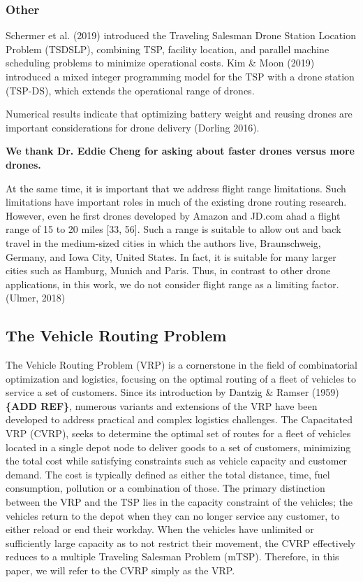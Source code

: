 \documentclass{article}
\begin{document}
	\subsubsection{Other}
	Schermer et al. (2019) introduced the Traveling Salesman Drone Station Location Problem (TSDSLP), combining TSP, facility location, and parallel machine scheduling problems to minimize operational costs. 
	Kim \& Moon (2019) introduced a mixed integer programming model for the TSP with a drone station (TSP-DS), which extends the operational range of drones. 
	\par 
	\par 
	Numerical results indicate that optimizing battery weight and reusing drones are important considerations for drone delivery (Dorling 2016).
	\par 
	\textbf{We thank Dr. Eddie Cheng for asking about faster drones versus more drones.}
	\par
	At the same time, it is important that we address flight range limitations. Such limitations have important roles in much of the existing drone routing research. However, even he first drones developed by Amazon and JD.com ahad a flight range of 15 to 20 miles [33, 56]. Such a range is suitable to allow out and back travel in the medium-sized cities in which the authors live, Braunschweig, Germany, and Iowa City, United States. In fact, it is suitable for many larger cities such as Hamburg, Munich and Paris. Thus, in contrast to other drone applications, in this work, we do not consider flight range as a limiting factor. (Ulmer, 2018)
	
	
	\subsection{The Vehicle Routing Problem}
	The Vehicle Routing Problem (VRP) is a cornerstone in the field of combinatorial optimization and logistics, focusing on the optimal routing of a fleet of vehicles to service a set of customers. Since its introduction by Dantzig \& Ramser (1959) \textbf{\{ADD REF\}}, numerous variants and extensions of the VRP have been developed to address practical and complex logistics challenges. The Capacitated VRP (CVRP), seeks to determine the optimal set of routes for a fleet of vehicles located in a single depot node to deliver goods to a set
	of customers, minimizing the total cost while satisfying constraints such as vehicle capacity and customer demand. The cost is typically defined as either the total distance, time, fuel consumption, pollution or a combination of those. The primary distinction between the VRP and the TSP lies in the capacity constraint of the vehicles; the vehicles  return to the depot when they can no longer service any customer, to either reload or end their workday. When the vehicles have unlimited or sufficiently large capacity as to not restrict their movement, the CVRP effectively reduces to a multiple Traveling Salesman Problem (mTSP). Therefore, in this paper, we will refer to the CVRP simply as the VRP. 
	\par
\end{document}
